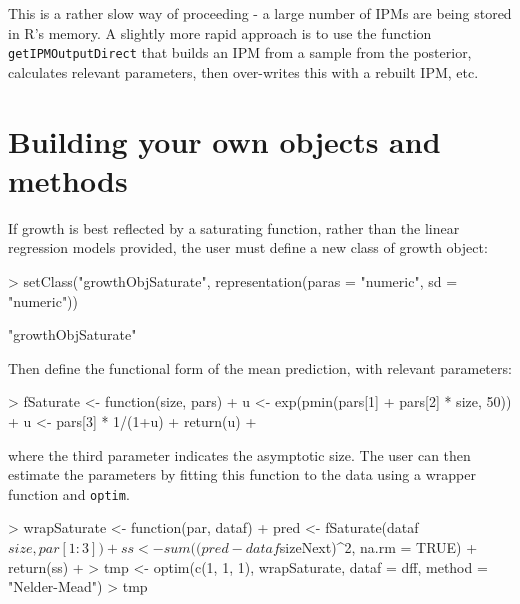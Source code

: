 \documentclass{article}
\begin{document}
This is a rather slow way of proceeding - a large number of IPMs are being stored in R's memory. A slightly more rapid approach is to use the function {\tt getIPMOutputDirect} that builds an IPM from a sample from the posterior, calculates relevant parameters, then over-writes this with a rebuilt IPM, etc.


\section{Building your own objects and methods}
If growth is best reflected by a saturating function, rather than the linear regression models provided, the user must define a new class of growth object:
\begin{Schunk}
\begin{Sinput}
> setClass("growthObjSaturate", representation(paras = "numeric", sd = "numeric"))
\end{Sinput}
\begin{Soutput}
[1] "growthObjSaturate"
\end{Soutput}
\end{Schunk}
Then define the functional form of the mean prediction, with relevant parameters: 
\begin{Schunk}
\begin{Sinput}
> fSaturate <- function(size, pars) { 
+     u <- exp(pmin(pars[1] + pars[2] * size, 50))
+     u <- pars[3] * 1/(1+u)
+     return(u)
+ }
\end{Sinput}
\end{Schunk}
where the third parameter indicates the asymptotic size. The user can then estimate the parameters by fitting this function to the data using a wrapper function and
{\tt optim}. 
\begin{Schunk}
\begin{Sinput}
> wrapSaturate <- function(par, dataf) { 
+     pred <- fSaturate(dataf$size, par[1:3])
+     ss <- sum((pred - dataf$sizeNext)^2, na.rm = TRUE)
+     return(ss)
+     }
> tmp <- optim(c(1, 1, 1), wrapSaturate, dataf = dff, method = "Nelder-Mead")
> tmp    
\end{Sinput}
\end{Schunk}
\end{document}
